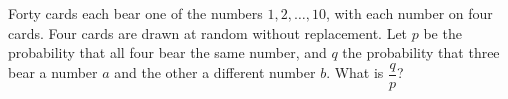 Forty cards each bear one of the numbers $1,2,\dots,10$, with each number on four cards. Four cards are drawn at random without replacement. Let $p$ be the probability that all four bear the same number, and $q$ the probability that three bear a number $a$ and the other a different number $b$. What is $\dfrac {q}{p}$?
